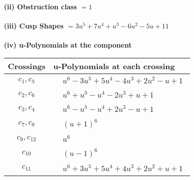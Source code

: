 \documentclass[1p]{elsarticle_modified}
\theoremstyle{definition}
\begin{document}
\flushleft \textbf{(ii) Obstruction class $= 1$}\\~\\
\flushleft \textbf{(iii) Cusp Shapes $= 3 u^5+7 u^4+u^3-6 u^2-5 u+11$}\\~\\
\newpage\renewcommand{\arraystretch}{1}
\flushleft \textbf{(iv) u-Polynomials at the component}\newline \\
\begin{tabular}{m{50pt}|m{274pt}}
Crossings & \hspace{64pt}u-Polynomials at each crossing \\
\hline $$\begin{aligned}c_{1},c_{5}\end{aligned}$$&$\begin{aligned}
&u^6-3 u^5+5 u^4-4 u^3+2 u^2- u+1
\end{aligned}$\\
\hline $$\begin{aligned}c_{2},c_{6}\end{aligned}$$&$\begin{aligned}
&u^6+u^5- u^4-2 u^3+u+1
\end{aligned}$\\
\hline $$\begin{aligned}c_{3},c_{4}\end{aligned}$$&$\begin{aligned}
&u^6- u^5- u^4+2 u^3- u+1
\end{aligned}$\\
\hline $$\begin{aligned}c_{7},c_{8}\end{aligned}$$&$\begin{aligned}
&(u+1)^6
\end{aligned}$\\
\hline $$\begin{aligned}c_{9},c_{12}\end{aligned}$$&$\begin{aligned}
&u^6
\end{aligned}$\\
\hline $$\begin{aligned}c_{10}\end{aligned}$$&$\begin{aligned}
&(u-1)^6
\end{aligned}$\\
\hline $$\begin{aligned}c_{11}\end{aligned}$$&$\begin{aligned}
&u^6+3 u^5+5 u^4+4 u^3+2 u^2+u+1
\end{aligned}$\\
\hline
\end{tabular}\\~\\
\end{document}
